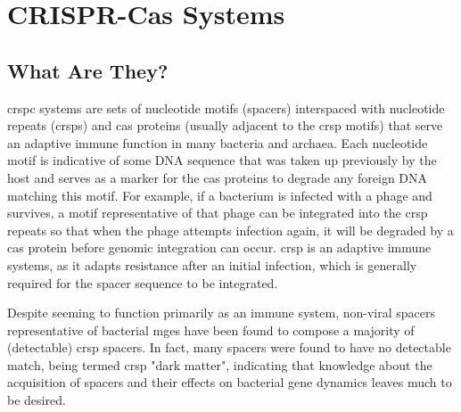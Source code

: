\section{CRISPR-Cas Systems}
\subsection{What Are They?}
\ac{crspc} systems are sets of nucleotide motifs (spacers) interspaced with nucleotide repeats (\ac{crsp}s) and \ac{cas} proteins (usually adjacent to the \ac{crsp} motifs) that serve an adaptive immune function in many bacteria and archaea\citep{crispgen}.
Each nucleotide motif is indicative of some DNA sequence that was taken up previously by the host and serves as a marker for the \ac{cas} proteins to degrade any foreign DNA matching this motif\citep{crispgen}.
For example, if a bacterium is infected with a phage and survives, a motif representative of that phage can be integrated into the \ac{crsp} repeats so that when the phage attempts infection again, it will be degraded by a \ac{cas} protein before genomic integration can occur.
\ac{crsp} is an adaptive immune systems, as it adapts resistance after an initial infection, which is generally required for the spacer sequence to be integrated.\par
Despite seeming to function primarily as an immune system, non-viral spacers representative of bacterial \ac{mge}s have been found to compose a majority of (detectable) \ac{crsp} spacers\citep{nonvspacer}.
In fact, many spacers were found to have no detectable match, being termed \ac{crsp} "dark matter", indicating that knowledge about the acquisition of spacers and their effects on bacterial gene dynamics leaves much to be desired\citep{nonvspacer}.
